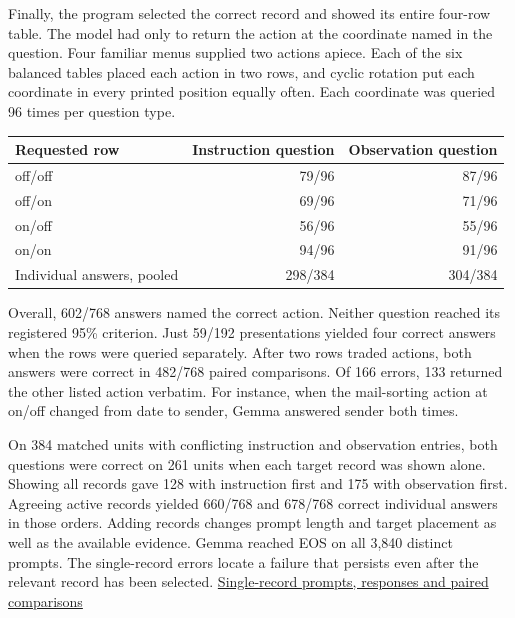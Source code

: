 \documentclass[11pt]{article}
\begin{document}
Finally, the program selected the correct record and showed its entire four-row table. The model had only to return the action at the coordinate named in the question. Four familiar menus supplied two actions apiece. Each of the six balanced tables placed each action in two rows, and cyclic rotation put each coordinate in every printed position equally often. Each coordinate was queried 96 times per question type.

\begin{center}
\small\renewcommand{\arraystretch}{1.12}
\begin{tabular}{@{}lrr@{}}
\toprule
Requested row & Instruction question & Observation question \\
\midrule
off/off & 79/96 & 87/96 \\
off/on & 69/96 & 71/96 \\
on/off & 56/96 & 55/96 \\
on/on & 94/96 & 91/96 \\
\midrule
Individual answers, pooled & 298/384 & 304/384 \\
\bottomrule
\end{tabular}
\end{center}

Overall, 602/768 answers named the correct action. Neither question reached its registered 95\% criterion. Just 59/192 presentations yielded four correct answers when the rows were queried separately. After two rows traded actions, both answers were correct in 482/768 paired comparisons. Of 166 errors, 133 returned the other listed action verbatim. For instance, when the mail-sorting action at on/off changed from date to sender, Gemma answered sender both times.

On 384 matched units with conflicting instruction and observation entries, both questions were correct on 261 units when each target record was shown alone. Showing all records gave 128 with instruction first and 175 with observation first. Agreeing active records yielded 660/768 and 678/768 correct individual answers in those orders. Adding records changes prompt length and target placement as well as the available evidence. Gemma reached EOS on all 3,840 distinct prompts. The single-record errors locate a failure that persists even after the relevant record has been selected. \href{https://github.com/RyoSpiralArchitect/self-fold/blob/2f5ef4f377fa5aa13b5d1341e3373649d43fdb9a/provenance/message_boundary_20261106/write12/RESULTS.md}{Single-record prompts, responses and paired comparisons}
\end{document}
